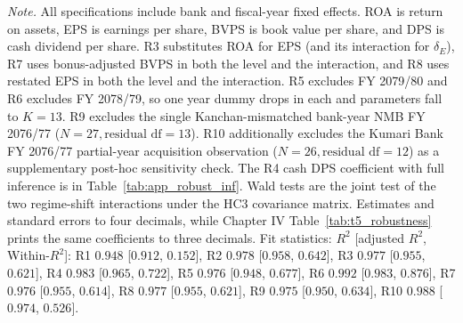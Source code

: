 \begin{table}[!htbp]
\vspace{4pt}
\begin{minipage}{\linewidth}
\footnotesize
\textit{Note.} All specifications include bank and fiscal-year fixed effects. ROA is return on assets, EPS is earnings per share, BVPS is book value per share, and DPS is cash dividend per share. R3 substitutes ROA for EPS (and its interaction for $\delta_E$), R7 uses bonus-adjusted BVPS in both the level and the interaction, and R8 uses restated EPS in both the level and the interaction. R5 excludes FY 2079/80 and R6 excludes FY 2078/79, so one year dummy drops in each and parameters fall to $K = 13$. R9 excludes the single Kanchan-mismatched bank-year NMB FY 2076/77 ($N = 27, \text{residual df} = 13$). R10 additionally excludes the Kumari Bank FY 2076/77 partial-year acquisition observation ($N = 26, \text{residual df} = 12$) as a supplementary post-hoc sensitivity check. The R4 cash DPS coefficient with full inference is in Table~\ref{tab:app_robust_inf}. Wald tests are the joint test of the two regime-shift interactions under the HC3 covariance matrix. Estimates and standard errors to four decimals, while Chapter IV Table~\ref{tab:t5_robustness} prints the same coefficients to three decimals. Fit statistics: $R^2$ [adjusted $R^2$, Within-$R^2$]: R1 $0.948$ [$0.912$, $0.152$], R2 $0.978$ [$0.958$, $0.642$], R3 $0.977$ [$0.955$, $0.621$], R4 $0.983$ [$0.965$, $0.722$], R5 $0.976$ [$0.948$, $0.677$], R6 $0.992$ [$0.983$, $0.876$], R7 $0.976$ [$0.955$, $0.614$], R8 $0.977$ [$0.955$, $0.621$], R9 $0.975$ [$0.950$, $0.634$], R10 $0.988$ [$0.974$, $0.526$].
\end{minipage}
\end{table}

